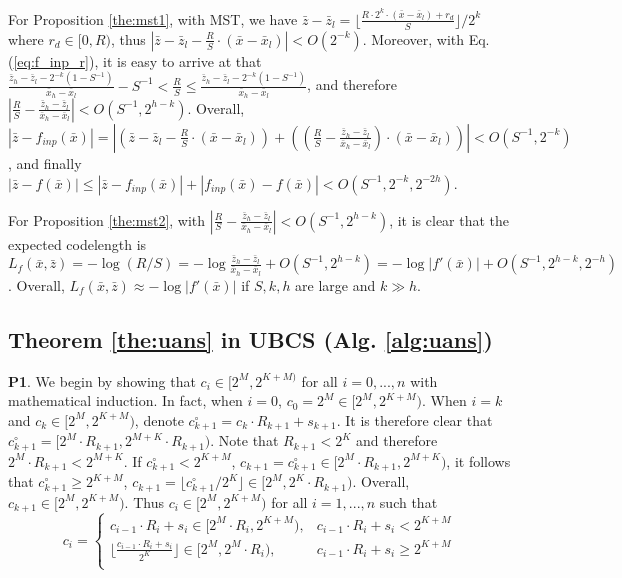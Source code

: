 \documentclass{article}
\newcommand{\quant}[1]{\bar{#1}}
\begin{document}
For Proposition \ref{the:mst1}, with MST, we have $\quant{z} - \quant{z}_l = \lfloor \frac{R\cdot 2^k \cdot (\quant{x} - \quant{x}_l) + r_d}{S} \rfloor / 2^k$ where $r_d \in [0, R)$, thus $|\quant{z} - \quant{z}_l - \frac{R}{S} \cdot (\quant{x} - \quant{x}_l)| < O(2^{-k})$. Moreover, with Eq. (\ref{eq:f_inp_r}), it is easy to arrive at that $\frac{\quant{z}_h - \quant{z}_l - 2^{-k}(1 - S^{-1})}{\quant{x}_h - \quant{x}_l} - S^{-1} < \frac{R}{S} \le  \frac{\quant{z}_h - \quant{z}_l - 2^{-k}(1 - S^{-1})}{\quant{x}_h - \quant{x}_l}$, and therefore $|\frac{R}{S} - \frac{\quant{z}_h - \quant{z}_l}{\quant{x}_h - \quant{x}_l}| < O(S^{-1}, 2^{h-k})$. Overall, $|\quant{z} - f_{inp} (\quant{x})| = |(\quant{z} - \quant{z}_l - \frac{R}{S} \cdot (\quant{x} - \quant{x}_l)) + ((\frac{R}{S} - \frac{\quant{z}_h - \quant{z}_l}{\quant{x}_h - \quant{x}_l}) \cdot (\quant{x} - \quant{x}_l))| < O(S^{-1}, 2^{-k})$, and finally $|\quant{z} - f(\quant{x})| \le |\quant{z} - f_{inp}(\quant{x})| + |f_{inp}(\quant{x}) - f(\quant{x})| < O(S^{-1}, 2^{-k}, 2^{-2h})$.

For Proposition \ref{the:mst2}, with $|\frac{R}{S} - \frac{\quant{z}_h - \quant{z}_l}{\quant{x}_h - \quant{x}_l}| < O(S^{-1}, 2^{h-k})$, it is clear that the expected codelength is $L_f (\quant{x}, \quant{z}) = - \log (R/S) = - \log \frac{\quant{z}_h - \quant{z}_l}{\quant{x}_h - \quant{x}_l} + O(S^{-1}, 2^{h-k}) = -\log |f'(\quant{x})| + O(S^{-1}, 2^{h-k}, 2^{-h})$. Overall, $L_f (\quant{x}, \quant{z}) \approx -\log |f'(\quant{x})|$ if $S, k, h$ are large and $k \gg h$. 

\subsection{Theorem \ref{the:uans} in UBCS (Alg. \ref{alg:uans})}

\textbf{P1}. We begin by showing that $c_i \in [2^M, 2^{K+M)}$ for all $i = 0, ..., n$ with mathematical induction. In fact, when $i = 0$, $c_0 = 2^M \in [2^M, 2^{K+M})$. When $i=k$ and $c_k \in [2^M, 2^{K+M})$, denote $c_{k+1}^\circ = c_k \cdot R_{k+1} + s_{k+1}$. It is therefore clear that $c_{k+1}^\circ = [2^M \cdot R_{k+1}, 2^{M+K} \cdot R_{k+1})$. Note that $R_{k+1} < 2^K$ and therefore $2^M \cdot R_{k+1} < 2^{M+K}$. If $c_{k+1}^\circ < 2^{K+M}$, $c_{k+1} = c_{k+1}^\circ \in [2^M \cdot R_{k+1}, 2^{M+K})$, it follows that $c_{k+1}^\circ \ge 2^{K+M}$, $c_{k+1} = \lfloor c_{k+1}^\circ / 2^K \rfloor \in [2^M, 2^K \cdot R_{k+1})$. Overall, $c_{k+1} \in [2^M, 2^{K+M})$. Thus $c_i \in [2^M, 2^{K+M})$ for all $i = 1, ..., n$ such that
\begin{equation}
c_i = 
\begin{cases}
c_{i-1} \cdot R_i + s_i \in [2^M \cdot R_i, 2^{K+M}), & c_{i-1} \cdot R_i + s_i < 2^{K+M} \\
\lfloor \frac{c_{i-1} \cdot R_i + s_i}{2^K} \rfloor \in [2^M, 2^M \cdot R_i), & c_{i-1} \cdot R_i + s_i \ge 2^{K+M} \\
\end{cases}
\label{eq:uans_states}
\end{equation}
\end{document}
